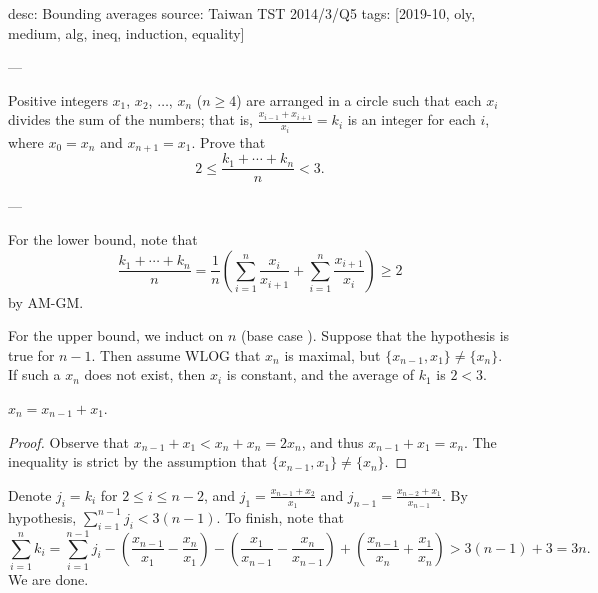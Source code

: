 desc: Bounding averages
source: Taiwan TST 2014/3/Q5
tags: [2019-10, oly, medium, alg, ineq, induction, equality]

---

Positive integers $x_1$, $x_2$, $\ldots$, $x_n$ ($n\ge4$) are arranged in a circle such that each $x_i$ divides the sum of the numbers; that is, $\frac{x_{i-1}+x_{i+1}}{x_i}=k_i$ is an integer for each $i$, where $x_0=x_n$ and $x_{n+1}=x_1$. Prove that \[2\le\frac{k_1+\cdots+k_n}n<3.\]

---

For the lower bound, note that \[\frac{k_1+\cdots+k_n}n=\frac1n\left(\sum_{i=1}^n\frac{x_i}{x_{i+1}}+\sum_{i=1}^n\frac{x_{i+1}}{x_i}\right)\ge2\]
by AM-GM.

For the upper bound, we induct on $n$ (base case ). Suppose that the hypothesis is true for $n-1$. Then assume WLOG that $x_n$ is maximal, but $\{x_{n-1},x_1\}\ne\{x_n\}$. If such a $x_n$ does not exist, then $x_i$ is constant, and the average of $k_1$ is $2<3$.
\begin{claim*}
    $x_n=x_{n-1}+x_1$.
\end{claim*}
\begin{proof}
    Observe that $x_{n-1}+x_1<x_n+x_n=2x_n$, and thus $x_{n-1}+x_1=x_n$. The inequality is strict by the assumption that $\{x_{n-1},x_1\}\ne\{x_n\}$.
\end{proof}

Denote $j_i=k_i$ for $2\le i\le n-2$, and $j_1=\frac{x_{n-1}+x_2}{x_1}$ and $j_{n-1}=\frac{x_{n-2}+x_1}{x_{n-1}}$. By hypothesis, $\sum_{i=1}^{n-1}j_i<3(n-1)$. To finish, note that \[\sum_{i=1}^nk_i=\sum_{i=1}^{n-1}j_i-\left(\frac{x_{n-1}}{x_1}-\frac{x_n}{x_1}\right)-\left(\frac{x_1}{x_{n-1}}-\frac{x_n}{x_{n-1}}\right)+\left(\frac{x_{n-1}}{x_n}+\frac{x_1}{x_n}\right)>3(n-1)+3=3n.\]
We are done.
